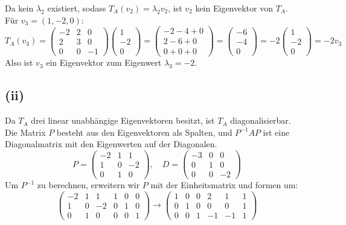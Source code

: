 \documentclass{article}
\begin{document}
Da kein $\lambda_2$ existiert, sodass $T_A(v_2) = \lambda_2 v_2$, ist $v_2$ kein Eigenvektor von $T_A$. \\
Für $v_3 = (1, -2, 0)$:
\[T_A(v_3) = \begin{pmatrix} -2 & 2 & 0 \\ 2 & 3 & 0 \\ 0 & 0 & -1 \end{pmatrix} \begin{pmatrix} 1 \\ -2 \\ 0 \end{pmatrix} = \begin{pmatrix} -2 - 4 + 0 \\ 2 - 6 + 0 \\ 0 + 0 + 0 \end{pmatrix} = \begin{pmatrix} -6 \\ -4 \\ 0 \end{pmatrix} = -2 \begin{pmatrix} 1 \\ -2 \\ 0 \end{pmatrix} = -2v_3\]
Also ist $v_3$ ein Eigenvektor zum Eigenwert $\lambda_3 = -2$.

\subsection*{(ii)}
Da $T_A$ drei linear unabhängige Eigenvektoren besitzt, ist $T_A$ diagonalisierbar. \\
Die Matrix $P$ besteht aus den Eigenvektoren als Spalten, und $P^{-1}AP$ ist eine Diagonalmatrix mit den Eigenwerten auf der Diagonalen.
\[P = \begin{pmatrix} -2 & 1 & 1 \\ 1 & 0 & -2 \\ 0 & 1 & 0 \end{pmatrix}, \quad D = \begin{pmatrix} -3 & 0 & 0 \\ 0 & 1 & 0 \\ 0 & 0 & -2 \end{pmatrix}\]
Um $P^{-1}$ zu berechnen, erweitern wir $P$ mit der Einheitsmatrix und formen um:
\[\begin{pmatrix} -2 & 1 & 1 & 1 & 0 & 0 \\ 1 & 0 & -2 & 0 & 1 & 0 \\ 0 & 1 & 0 & 0 & 0 & 1 \end{pmatrix} \rightarrow \begin{pmatrix} 1 & 0 & 0 & 2 & 1 & 1 \\ 0 & 1 & 0 & 0 & 0 & 1 \\ 0 & 0 & 1 & -1 & -1 & 1 \end{pmatrix}\]
\end{document}
